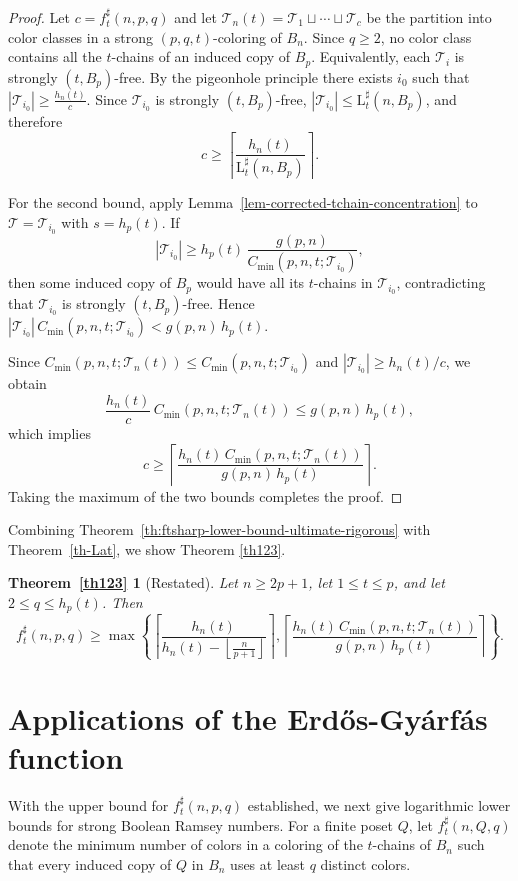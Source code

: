 \documentclass[twoside,12pt]{article}
\newcommand{\flr}[1]{\left\lfloor #1 \right\rfloor}
\newcommand{\floor}[1]{\flr{#1}}
\newcommand{\ceil}[1]{\left\lceil #1 \right\rceil}
\newcommand{\LT}{\mathrm{L}}
\begin{document}
\begin{proof}
Let \(c=f_t^\sharp(n,p,q)\) and let
$\mathcal T_n(t)=\mathcal T_1\sqcup \cdots \sqcup \mathcal T_c$
be the partition into color classes in a strong \((p,q,t)\)-coloring of \(B_n\). Since \(q\ge2\), no color class contains all the \(t\)-chains of an induced copy of \(B_p\). Equivalently, each \(\mathcal T_i\) is strongly \((t,B_p)\)-free. By the pigeonhole principle there exists \(i_0\) such that
$|\mathcal T_{i_0}|\ge \frac{h_n(t)}{c}$.
Since \(\mathcal T_{i_0}\) is strongly \((t,B_p)\)-free,
$|\mathcal T_{i_0}|\le \LT_t^\sharp(n,B_p)$,
and therefore
\[
c\ge \ceil{\frac{h_n(t)}{\LT_t^\sharp(n,B_p)}}.
\]

For the second bound, apply Lemma~\ref{lem-corrected-tchain-concentration} to \(\mathcal T=\mathcal T_{i_0}\) with \(s=h_p(t)\). If
\[
|\mathcal T_{i_0}|
\ge
h_p(t)\,\frac{g(p,n)}{C_{\min}(p,n,t;\mathcal T_{i_0})},
\]
then some induced copy of \(B_p\) would have all its \(t\)-chains in \(\mathcal T_{i_0}\), contradicting that \(\mathcal T_{i_0}\) is strongly \((t,B_p)\)-free. Hence
$|\mathcal T_{i_0}|\,C_{\min}(p,n,t;\mathcal T_{i_0})
<
g(p,n)\,h_p(t)$.

Since \(C_{\min}(p,n,t;\mathcal T_n(t))\le C_{\min}(p,n,t;\mathcal T_{i_0})\) and \(|\mathcal T_{i_0}|\ge h_n(t)/c\), we obtain
\[
\frac{h_n(t)}{c}\,C_{\min}(p,n,t;\mathcal T_n(t))
\le
g(p,n)\,h_p(t),
\]
which implies
\[
c\ge
\ceil{\frac{h_n(t)\,C_{\min}(p,n,t;\mathcal T_n(t))}{g(p,n)\,h_p(t)}}.
\]
Taking the maximum of the two bounds completes the proof.
\end{proof}
Combining Theorem~\ref{th:ftsharp-lower-bound-ultimate-rigorous} with Theorem~\ref{th-Lat}, we show Theorem \ref{th123}.
\newtheorem*{mainthm2}{\rm\bf Theorem~\ref{th123}}
\begin{mainthm2}[Restated]
Let $n\ge 2p+1$, let $1\le t\le p$, and let $2\le q\le h_p(t)$. Then
\[
f_t^\sharp(n,p,q)
\ge
\max\left\{
\ceil{\frac{h_n(t)}{h_n(t)-\floor{\frac{n}{p+1}}}},
\ceil{\frac{h_n(t)\,C_{\min}(p,n,t;\mathcal T_n(t))}{g(p,n)\,h_p(t)}}
\right\}.
\]
\end{mainthm2}



\section{Applications of the Erd\H{o}s-Gy\'{a}rf\'{a}s function}\label{sec5}

With the upper bound for $f_t^\sharp(n,p,q)$ established, we next give logarithmic lower bounds for strong Boolean Ramsey numbers.
For a finite poset $Q$, let $f_t^\sharp(n,Q,q)$ denote the minimum number of colors in a coloring of the $t$-chains of $B_n$ such that every induced copy of $Q$ in $B_n$ uses at least $q$ distinct colors.
\end{document}
